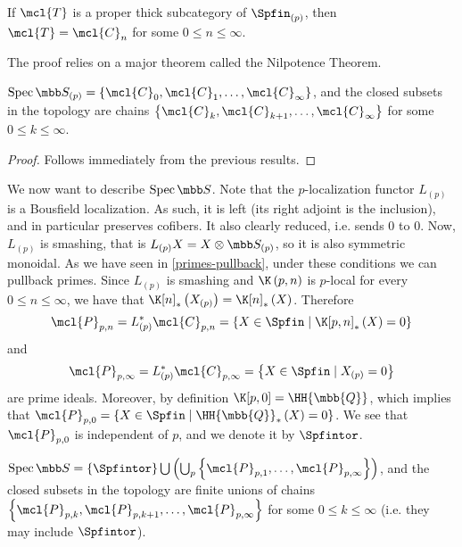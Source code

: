 \begin{theorem}\label{thick-subcategory-thm}
	If $\mcl{T}$ is a proper thick subcategory of $\Spfin_{\left(p\right)}$, then $\mcl{T} = \mcl{C}_n$ for some $0 \leq n \leq \infty$.
\end{theorem}

\begin{remark}
	The proof relies on a major theorem called the Nilpotence Theorem.
\end{remark}

\begin{corollary}
	$\spec \SS_{\left(p\right)} = \left\{ \mcl{C}_0, \mcl{C}_1, \dotsc, \mcl{C}_\infty \right\}$,
	and the closed subsets in the topology are chains
	$\left\{ \mcl{C}_k, \mcl{C}_{k+1}, \dotsc, \mcl{C}_\infty \right\}$
	for some $0 \leq k \leq \infty$.
\end{corollary}

\begin{proof}
	Follows immediately from the previous results.
\end{proof}

We now want to describe $\spec \SS$.
Note that the $p$-localization functor $L_{\left(p\right)}$ is a Bousfield localization.
As such, it is left (its right adjoint is the inclusion), and in particular preserves cofibers.
It also clearly reduced, i.e. sends $0$ to $0$.
Now, $L_{\left(p\right)}$ is smashing, that is $L_{\left(p\right)} X = X \otimes \SS_{\left(p\right)}$, so it is also symmetric monoidal.
As we have seen in \ref{primes-pullback}, under these conditions we can pullback primes.
Since $L_{\left(p\right)}$ is smashing and $\K\left(p,n\right)$ is $p$-local for every $0 \leq n \leq \infty$, we have that $\K[n]_*\left(X_{\left(p\right)}\right) = \K[n]_*\left(X\right)$.
Therefore
$$
\mcl{P}_{p, n}
= L_{\left(p\right)}^* \mcl{C}_{p, n}
= \left\{
	X \in \Spfin
	\mid
	\K[p,n]_*\left(X\right) = 0
\right\}
$$
and
$$
\mcl{P}_{p, \infty}
= L_{\left(p\right)}^* \mcl{C}_{p, \infty}
= \left\{
	X \in \Spfin
	\mid
	X_{\left(p\right)} = 0
\right\}
$$
are prime ideals.
Moreover, by definition $\K[p,0] = \HH{\mbb{Q}}$, which implies that
$
\mcl{P}_{p, 0}
= \left\{
	X \in \Spfin
	\mid
	{\HH{\mbb{Q}}}_*\left(X\right) = 0
\right\}
$.
We see that $\mcl{P}_{p, 0}$ is independent of $p$, and we denote it by $\Spfintor$.

\begin{theorem}[\todo{explain/reference}]
	$
	\spec \SS
	= \left\{\Spfintor\right\}
	\bigcup \left(\bigcup_p \left\{\mcl{P}_{p, 1}, \dotsc, \mcl{P}_{p, \infty}\right\}\right)
	$,
	and the closed subsets in the topology are finite unions of chains
	$\left\{ \mcl{P}_{p, k}, \mcl{P}_{p, k+1}, \dotsc, \mcl{P}_{p, \infty} \right\}$
	for some $0 \leq k \leq \infty$ (i.e. they may include $\Spfintor$).
\end{theorem}

